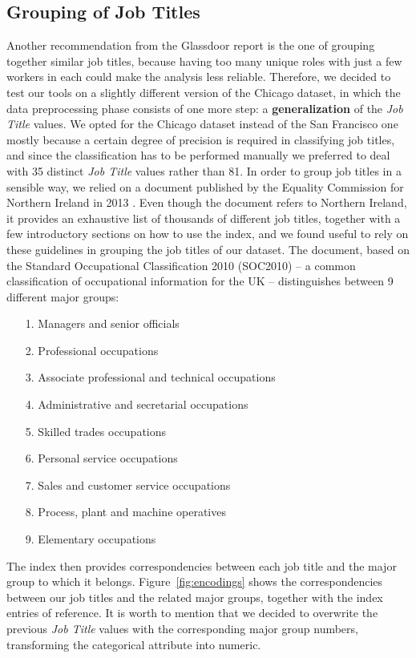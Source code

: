 \subsection{Grouping of Job Titles}
Another recommendation from the Glassdoor report \cite{chamberlain2017analyze} is the one of grouping together similar job titles, because having too many unique roles with just a few workers in each could make the analysis less reliable. Therefore, we decided to test our tools on a slightly different version of the Chicago dataset, in which the data preprocessing phase consists of one more step: a \textbf{generalization} of the \textit{Job Title} values. We opted for the Chicago dataset instead of the San Francisco one mostly because a certain degree of precision is required in classifying job titles, and since the classification has to be performed manually we preferred to deal with 35 distinct \textit{Job Title} values rather than 81. In order to group job titles in a sensible way, we relied on a document published by the Equality Commission for Northern Ireland in 2013 \cite{equality2013index}. Even though the document refers to Northern Ireland, it provides an exhaustive list of thousands of different job titles, together with a few introductory sections on how to use the index, and we found useful to rely on these guidelines in grouping the job titles of our dataset. The document, based on the Standard Occupational Classification 2010 (SOC2010) -- a common classification of occupational information for the UK -- distinguishes between 9 different major groups:
\begin{itemize}
\item[1.] Managers and senior officials
\item[2.] Professional occupations
\item[3.] Associate professional and technical occupations
\item[4.] Administrative and secretarial occupations
\item[5.] Skilled trades occupations
\item[6.] Personal service occupations
\item[7.] Sales and customer service occupations
\item[8.] Process, plant and machine operatives
\item[9.] Elementary occupations
\end{itemize}
The index then provides correspondencies between each job title and the major group to which it belongs. Figure~\ref{fig:encodings} shows the correspondencies between our job titles and the related major groups, together with the index entries of reference. It is worth to mention that we decided to overwrite the previous \textit{Job Title} values with the corresponding major group numbers, transforming the categorical attribute into numeric.

